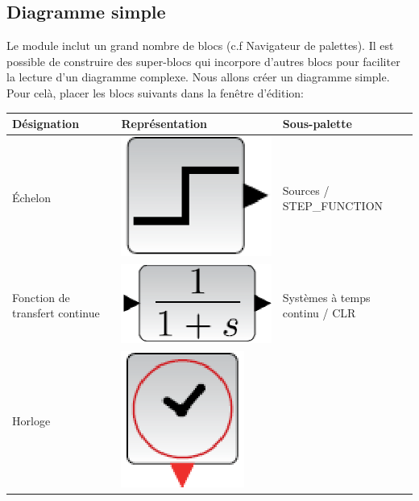 \subsection{Diagramme simple}
Le module inclut un grand nombre de blocs (c.f Navigateur de palettes).
Il est possible de construire des super-blocs qui incorpore d'autres blocs pour
faciliter la lecture d'un diagramme complexe. \newline
Nous allons créer un diagramme simple. Pour celà, placer les blocs suivants 
dans la fenêtre d'édition:
\begin{table}[!h]
    \centering
    \begin{tabular}{@{}P{4cm}P{6cm}P{4cm}@{}}
    \toprule
    Désignation   & Représentation & Sous-palette \\
    \midrule
    \'Echelon     & 
    \begin{minipage}{6cm}
    \centering
    \includegraphics[width=0.25\linewidth]{fig/scilab05.eps}
    \end{minipage} &
    Sources / STEP\_FUNCTION \\
    \midrule
    Fonction de transfert continue     & 
    \begin{minipage}{6cm}
    \centering
    \includegraphics[width=0.25\linewidth]{fig/scilab06.eps}
    \end{minipage} & 
    Systèmes à temps continu / CLR \\
    \midrule
    Horloge       & 
    \begin{minipage}{6cm}
    \centering
    \includegraphics[width=0.2\linewidth]{fig/scilab07.eps}

\end{minipage}
\end{tabular}
\end{table}
